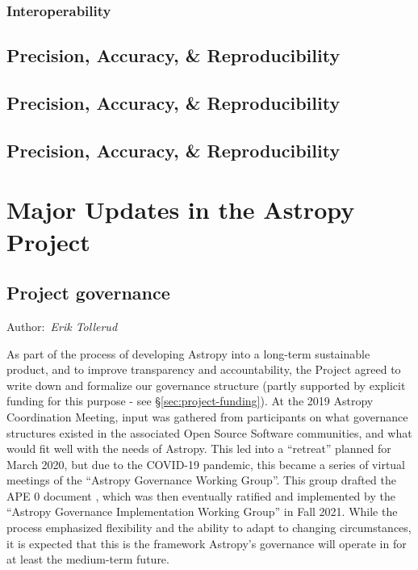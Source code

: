 \documentclass[modern]{aastex631}
\newcommand{\secauthor}[1]{{\color{blue}Author:~\textit{#1}}}
\begin{document}
\subsubsection*{Interoperability} \label{sec:core-features-interoperability}

\subsection*{Precision, Accuracy, \& Reproducibility} \label{sec:core-features-precision_accuracy_repreducibility}


\subsection*{Precision, Accuracy, \& Reproducibility} \label{sec:core-features-performance}


\subsection*{Precision, Accuracy, \& Reproducibility} \label{sec:core-features-future}




\section{Major Updates in the Astropy Project} \label{sec:project-updates}

\subsection{Project governance} \label{sec:project-governance}

\secauthor{Erik Tollerud}


As part of the process of developing Astropy into a long-term sustainable
product, and to improve transparency and accountability, the Project agreed to
write down and formalize our governance structure (partly supported by explicit
funding for this purpose - see \S \ref{sec:project-funding}). At the 2019
Astropy Coordination Meeting, input was gathered from participants on what governance
structures existed in the associated Open Source Software communities, and what
would fit well with the needs of Astropy. This led into a ``retreat'' planned
for March 2020, but due to the COVID-19 pandemic, this became a series of
virtual meetings of the ``Astropy Governance Working Group''.  This group
drafted the APE 0 document \citep{ape0}, which was then eventually ratified and
implemented by the ``Astropy Governance Implementation Working Group'' in Fall
2021. While the process emphasized flexibility and the ability to adapt to
changing circumstances, it is expected that this is the framework Astropy's
governance will operate in for at least the medium-term future.
\end{document}
